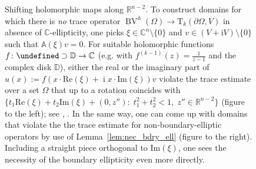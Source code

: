 \documentclass[a4paper,10pt]{amsart}
\let\C\undefined
\newcommand{\R}{\mathbb R}
\newcommand{\imag}{\operatorname{i}}
\newcommand{\bv}{\operatorname{BV}}
\newcommand{\A}{\mathbb{A}}
\newcommand{\C}{\mathbb{C}}
\numberwithin{equation}{section}
\theoremstyle{remark}
\numberwithin{equation}{section}
\begin{document}
\begin{figure}
		\caption{Shifting holomorphic maps along $\R^{n-2}$. To construct domains for which there is \emph{no} trace operator $\bv^{\A}(\Omega)\to\mathrm{T}_{k}(\partial\Omega,V)$ in absence of $\mathbb{C}$-ellipticity, one picks $\xi\in\mathbb{C}^{n}\setminus\{0\}$ and $v\in (V+\mathrm{i}V)\setminus\{0\}$ such that $\A(\xi)v=0$. For suitable holomorphic functions $f\colon \C\supset\mathbb{D}\to\mathbb{C}$ (e.g. with $f^{(k-1)}(z)=\frac{1}{z-1}$ and the complex disk $\mathbb{D}$), either the real or the imaginary part of $u(x):=f(x\cdot\mathrm{Re}(\xi)+\imag x\cdot\mathrm{Im}(\xi))v$ violate the trace estimate over a set $\Omega$ that up to a rotation coincides with $\{t_{1}\mathrm{Re}(\xi)+t_{2}\mathrm{Im}(\xi)+(0,z'')\colon\;t_{1}^{2}+t_{2}^{2}<1,\;z''\in\R^{n-2}\}$ (figure to the left); see \cite[Thm.~4.18]{BDG}, \cite{GRVS}. In the same way, one can come up with domains that violate the the trace estimate for non-boundary-elliptic operators by use of Lemma~\ref{lem:nec_bdry_ell} (figure to the right). Including a straight piece orthogonal to $\mathrm{Im}(\xi)$, one sees the necessity of the boundary ellipticity even more directly.}\label{fig:holshift}
	\end{figure}
\end{document}
